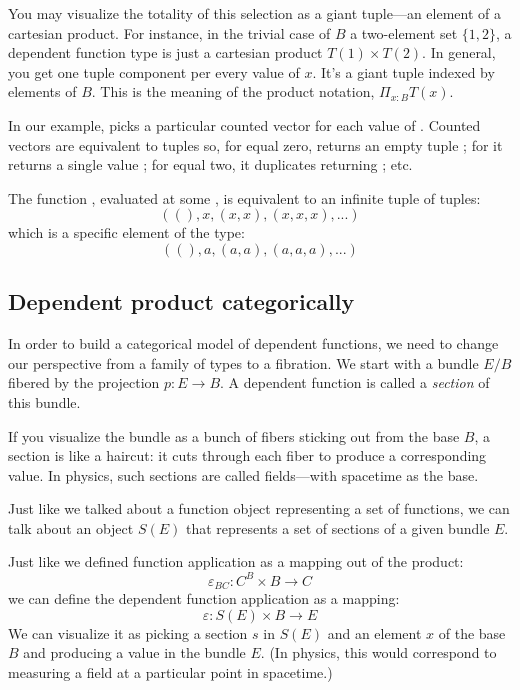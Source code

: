 \documentclass[DaoFP]{subfiles}
\begin{document}
You may visualize the totality of this selection as a giant tuple---an element of a cartesian product. For instance, in the trivial case of $B$ a two-element set $\{1, 2\}$, a dependent function type is just a cartesian product $T(1) \times T(2)$. In general, you get one tuple component per every value of $x$. It's a giant tuple indexed by elements of $B$. This is the meaning of the product notation, $\Pi_{x:B} T(x)$. 

In our example,  picks a particular counted vector for each value of . Counted vectors are equivalent to tuples so, for  equal zero,  returns an empty tuple \hask{()}; for  it returns a single value ; for  equal two, it duplicates  returning ; etc. 

The function , evaluated at some ,  is equivalent to an infinite tuple of tuples:
\[ ((), x, (x, x), (x, x, x), ...) \]
which is a specific element of the type:
\[ ((), a, (a, a), (a, a, a), ...) \]

\subsection{Dependent product categorically}
In order to build a categorical model of dependent functions, we need to change our perspective from a family of types to a fibration. We start with a bundle $E/B$ fibered by the projection $p\colon E \to B$. A dependent function is called a \emph{section} of this bundle. 

If you visualize the bundle as a bunch of fibers sticking out from the base $B$, a section is like a haircut: it cuts through each fiber to produce a corresponding value. In physics, such sections are called fields---with spacetime as the base. 

Just like we talked about a function object representing a set of functions, we can talk about an object $S(E)$ that represents a set of sections of a given bundle $E$. 

Just like we defined function application as a mapping out of the product:
\[\varepsilon_{B C} \colon C^B \times B \to C\]
we can define the dependent function application as a mapping:
\[\varepsilon \colon S(E) \times B \to E\]
We can visualize it as picking a section $s$ in $S(E)$ and an element $x$ of the base $B$ and producing a value in the bundle $E$. (In physics, this would correspond to measuring a field at a particular point in spacetime.)
\end{document}
